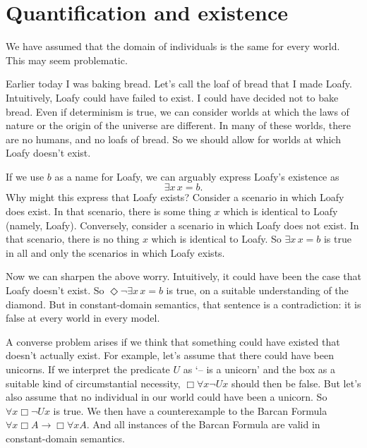 
\section{Quantification and existence}

We have assumed that the domain of individuals is the same for every world. This
may seem problematic.

Earlier today I was baking bread. Let's call the loaf of bread that I made
Loafy. Intuitively, Loafy could have failed to exist. I could have decided not
to bake bread. Even if determinism is true, we can consider worlds at which the
laws of nature or the origin of the universe are different. In many of these
worlds, there are no humans, and no loafs of bread. So we should allow for
worlds at which Loafy doesn't exist.

If we use $b$ as a name for Loafy, we can arguably express Loafy's existence as
\[
  \exists x \,x\!=\!b.
\]
Why might this express that Loafy exists? Consider a scenario in which Loafy does
exist. In that scenario, there is some thing $x$ which is identical to Loafy
(namely, Loafy). Conversely, consider a scenario in which Loafy does not exist.
In that scenario, there is no thing $x$ which is identical to Loafy. So
$\exists x\, x\!=\!b$ is true in all and only the scenarios in which Loafy exists.

Now we can sharpen the above worry. Intuitively, it could have been the case
that Loafy doesn't exist. So $\Diamond \neg \exists x\, x\!=\!b$ is true, on a
suitable understanding of the diamond. But in constant-domain semantics, that
sentence is a contradiction: it is false at every world in every model.

A converse problem arises if we think that something could have existed that
doesn't actually exist. For example, let's assume that there could have been
unicorns. If we interpret the predicate $U$ as `-- is a unicorn' and the box as
a suitable kind of circumstantial necessity, $\Box \forall x \neg Ux$ should
then be false. But let's also assume that no individual in our world could have
been a unicorn. So $\forall x \Box \neg Ux$ is true. We then have a
counterexample to the Barcan Formula $\forall x \Box A \to \Box \forall x A$.
And all instances of the Barcan Formula are valid in constant-domain semantics.


